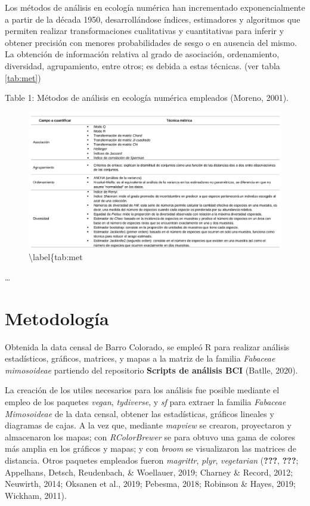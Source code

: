 \documentclass[11pt,]{article}
\begin{document}
Los métodos de análisis en ecología numérica han incrementado
exponencialmente a partir de la década 1950, desarrollándose índices,
estimadores y algoritmos que permiten realizar transformaciones
cualitativas y cuantitativas para inferir y obtener precisión con
menores probabilidades de sesgo o en ausencia del mismo. La obtención de
información relativa al grado de asociación, ordenamiento, diversidad,
agrupamiento, entre otros; es debida a estas técnicas. (ver tabla
\ref {tab:met})

Table 1: Métodos de análisis en ecología numérica empleados (Moreno,
2001).\label{tab:met}

\begin{figure}
\centering
\includegraphics[width=1.00000\textwidth]{Analisis/Diversidad/Tabla_Metodos_Analisis.png}
\caption{\textbackslash{}label\{tab:met}
\end{figure}

\ldots

\section{Metodología}\label{metodologuxeda}

Obtenida la data censal de Barro Colorado, se empleó R para realizar
análisis estadísticos, gráficos, matrices, y mapas a la matriz de la
familia \emph{Fabaceae mimosoideae} partiendo del repositorio
\textbf{Scripts de análisis BCI} (Batlle, 2020).

La creación de los utiles necesarios para los análisis fue posible
mediante el empleo de los paquetes \emph{vegan}, \emph{tydiverse}, y
\emph{sf} para extraer la familia \emph{Fabaceae Mimosoideae} de la data
censal, obtener las estadísticas, gráficos lineales y diagramas de
cajas. A la vez que, mediante \emph{mapview} se crearon, proyectaron y
almacenaron los mapas; con \emph{RColorBrewer} se para obtuvo una gama
de colores más amplia en los gráficos y mapas; y con \emph{broom} se
visualizaron las matrices de distancia. Otros paquetes empleados fueron
\emph{magrittr}, \emph{plyr}, \emph{vegetarian} ({\textbf{???}},
{\textbf{???}}; Appelhans, Detsch, Reudenbach, \& Woellauer, 2019;
Charney \& Record, 2012; Neuwirth, 2014; Oksanen et al., 2019; Pebesma,
2018; Robinson \& Hayes, 2019; Wickham, 2011).
\end{document}
